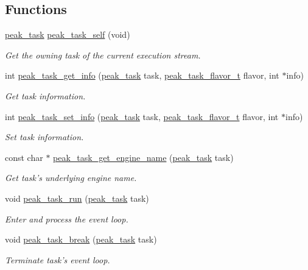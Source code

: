 \subsection*{Functions}
\begin{CompactItemize}
\item 
\hyperlink{group__task__common_ga0}{peak\_\-task} \hyperlink{group__task__common_ga4}{peak\_\-task\_\-self} (void)
\begin{CompactList}\small\item\em Get the owning task of the current execution stream. \item\end{CompactList}\item 
int \hyperlink{group__task__common_ga5}{peak\_\-task\_\-get\_\-info} (\hyperlink{group__task__common_ga0}{peak\_\-task} task, \hyperlink{group__task__common_ga1}{peak\_\-task\_\-flavor\_\-t} flavor, int $\ast$info)
\begin{CompactList}\small\item\em Get task information. \item\end{CompactList}\item 
int \hyperlink{group__task__common_ga6}{peak\_\-task\_\-set\_\-info} (\hyperlink{group__task__common_ga0}{peak\_\-task} task, \hyperlink{group__task__common_ga1}{peak\_\-task\_\-flavor\_\-t} flavor, int $\ast$info)
\begin{CompactList}\small\item\em Set task information. \item\end{CompactList}\item 
const char $\ast$ \hyperlink{group__task__common_ga7}{peak\_\-task\_\-get\_\-engine\_\-name} (\hyperlink{group__task__common_ga0}{peak\_\-task} task)
\begin{CompactList}\small\item\em Get task's underlying engine name. \item\end{CompactList}\item 
void \hyperlink{group__task__common_ga8}{peak\_\-task\_\-run} (\hyperlink{group__task__common_ga0}{peak\_\-task} task)
\begin{CompactList}\small\item\em Enter and process the event loop. \item\end{CompactList}\item 
void \hyperlink{group__task__common_ga9}{peak\_\-task\_\-break} (\hyperlink{group__task__common_ga0}{peak\_\-task} task)
\begin{CompactList}\small\item\em Terminate task's event loop. \item\end{CompactList}\end{CompactItemize}


